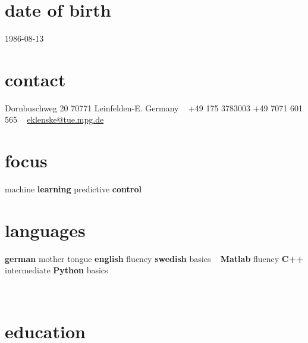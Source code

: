 \documentclass[a4paper]{k-cv} %
\begin{document}


\begin{aside} %
\section{date of birth}
\color{gray}1986-08-13
\section{contact}
\color{gray}Dornbuschweg 20
70771 Leinfelden-E.
Germany
~
+49 175 3783003
+49 7071 601 565
~
\href{mailto:eklenske@tue.mpg.de}{eklenske@tue.mpg.de}
\section{focus}
machine {\bfseries learning}
predictive {\bfseries control}
\section{languages}
{\bfseries german} mother tongue
{\bfseries english} fluency
{\bfseries swedish} basics
~
{\bfseries Matlab} fluency
{\bfseries C++} intermediate
{\bfseries Python} basics
\end{aside}

\
\section{education}\normalfont
\end{document}
